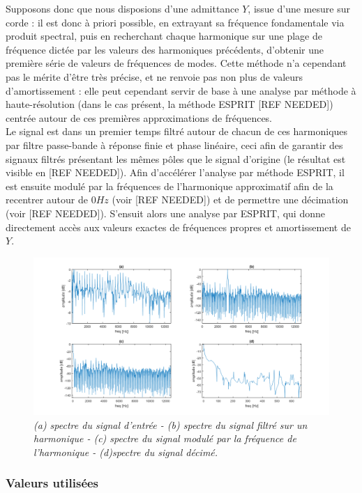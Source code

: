 Supposons donc que nous disposions d'une admittance $Y$, issue d'une mesure sur corde : il est donc à priori possible, en extrayant sa fréquence fondamentale via produit spectral, puis en recherchant chaque harmonique sur une plage de fréquence dictée par les valeurs des harmoniques précédents, d'obtenir une première série de valeurs de fréquences de modes. Cette méthode n'a cependant pas le mérite d'être très précise, et ne renvoie pas non plus de valeurs d'amortissement : elle peut cependant servir de base à une analyse par méthode à haute-résolution (dans le cas présent, la méthode ESPRIT [REF NEEDED]) centrée autour de ces premières approximations de fréquences.\\
Le signal est dans un premier temps filtré autour de chacun de ces harmoniques par filtre passe-bande à réponse finie et phase linéaire, ceci afin de garantir des signaux filtrés présentant les mêmes pôles que le signal d'origine (le résultat est visible en [REF NEEDED]). Afin d'accélérer l'analyse par méthode ESPRIT, il est ensuite modulé par la fréquences de l'harmonique approximatif afin de la recentrer autour de $0 Hz$ (voir [REF NEEDED]) et de permettre une décimation (voir [REF NEEDED]). S'ensuit alors une analyse par ESPRIT, qui donne directement accès aux valeurs exactes de fréquences propres et amortissement de $Y$.

\begin{figure}[hpbt]
\includegraphics[scale=0.5]{figures/pre_proc.png}
\caption{\textit{(a) spectre du signal d'entrée - (b) spectre du signal filtré sur un harmonique - (c) spectre du signal modulé par la fréquence de l'harmonique - (d)spectre du signal décimé.}}
\label{pre_proc}
\end{figure}

\subsubsection{Valeurs utilisées}

